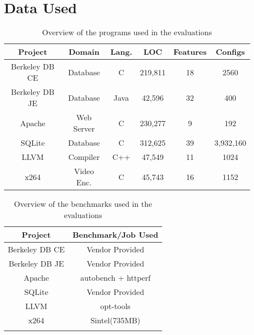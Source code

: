 \documentclass{sig-alternative}
\begin{document}
\section{Data Used}
\begin{table*}[!h]
 
 \begin{tabular}{c c c c c c} 

 
 \hline
 Project & Domain & Lang. & LOC & Features & Configs \\  
 \hline
 Berkeley DB CE & Database & C & 219,811 & 18 & 2560  \\ 
 
 Berkeley DB JE & Database & Java & 42,596 & 32 & 400 \\

 Apache & Web Server & C & 230,277 & 9 & 192 \\

 SQLite & Database & C & 312,625 & 39 & 3,932,160 \\
 
 LLVM & Compiler & C++ & 47,549 & 11 & 1024 \\ 

 x264 & Video Enc. & C & 45,743 & 16 & 1152 \\ 

\end{tabular}
 \caption{Overview of the programs used in the evaluations}
\end{table*}


 \begin{table*}[!h]
 

 \begin{tabular}{c c } 
 \hline
 Project & Benchmark/Job Used  \\  
 \hline
 Berkeley DB CE & Vendor Provided  \\ 
 
 Berkeley DB JE & Vendor Provided \\

 Apache & autobench + httperf \\

 SQLite & Vendor Provided \\
 
 LLVM & opt-tools \\ 

 x264 & Sintel(735MB) \\
 

\label{BenchMarkUsed} 
\end{tabular}
\caption{Overview of the benchmarks used in the evaluations}
\end{table*}
\end{document}
